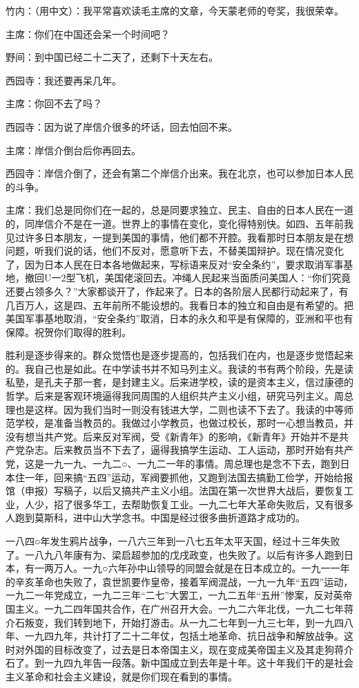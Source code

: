 竹内：（用中文）：我平常喜欢读毛主席的文章，今天蒙老师的夸奖，我很荣幸。

主席：你们在中国还会呆一个时间吧？

野间：到中国已经二十二天了，还剩下十天左右。

西园寺：我还要再呆几年。

主席：你回不去了吗？

西园寺：因为说了岸信介很多的坏话，回去怕回不来。

主席：岸信介倒台后你再回去。

西园寺：岸信介倒了，还会有第二个岸信介出来。我在北京，也可以参加日本人民的斗争。

主席：我们总是同你们在一起的，总是同要求独立、民主、自由的日本人民在一道的，同岸信介不是在一道。世界上的事情在变化，变化得特别快。如四、五年前我见过许多日本朋友，一提到美国的事情，他们都不开腔。我看那时日本朋友是在想问题，听我们说的话，他们不反对，愿意听下去，不替美国辩护。现在情况变化了，因为日本人民在日本各地做起来，写标语来反对“安全条约”，要求取消军事基地，撤回U一2型飞机，美国佬滚回去。冲绳人民起来当面质问美国人：“你们究竟还要占领多久？”大家都谈开了，作起来了。日本的各阶层人民都行动起来了，有几百万人，这是四、五年前所不能设想的。我看日本的独立和自由是有希望的。把美国军事基地取消，“安全条约”取消，日本的永久和平是有保障的，亚洲和平也有保障。祝贺你们取得的胜利。

胜利是逐步得来的。群众觉悟也是逐步提高的，包括我们在内，也是逐步觉悟起来的。我自己也是如此。在中学读书并不知马列主义。我读的书有两个阶段，先是读私塾，是孔夫子那一套，是封建主义。后来进学校，读的是资本主义，信过康德的哲学。后来是客观环境逼得我同周围的人组织共产主义小组，研究马列主义。周总理也是这样。因为我们当时一则没有钱进大学，二则也读不下去了。我读的中等师范学校，是准备当教员的。我做过小学教员，也做过校长，那时一心想当教员，并没有想当共产党。后来反对军阀，受《新青年》的影响，《新青年》开始并不是共产党杂志。后来教员当不下去了，逼得我搞学生运动、工人运动，那时开始有共产党，这是一九一九、一九二○、一九二一年的事情。周总理也是念不下去，跑到日本住一年，回来搞“五四”运动，军阀要抓他，又跑到法国去搞勤工俭学，开始给报馆（申报）写稿子，以后又搞共产主义小组。法国在第一次世界大战后，要恢复工业，人少，招了很多华工，去帮助恢复工业。一九二七年大革命失败后，又有很多人跑到莫斯科，进中山大学念书。中国是经过很多曲折道路才成功的。

一八四○年发生鸦片战争，一八六三年到一八七五年太平天国，经过十三年失败了。一八九八年康有为、梁启超参加的戊戌政变，也失败了。以后有许多人跑到日本，有一两万人。一九○六年孙中山领导的同盟会就是在日本成立的。一九一一年的辛亥革命也失败了，袁世凯要作皇帝，接着军阀混战，一九一九年“五四”运动，一九二一年党成立，一九二三年“二七”大罢工，一九二五年“五卅”惨案，反对英帝国主义。一九二四年国共合作，在广州召开大会。一九二六年北伐，一九二七年蒋介石叛变，我们转到地下，开始打游击。从一九二七年到一九三七年，到一九四八年、一九四九年，共计打了二十二年仗，包括土地革命、抗日战争和解放战争。这时对外国的目标改变了，过去是日本帝国主义，现在变成美帝国主义及其走狗蒋介石了。到一九四九年告一段落。新中国成立到去年是十年。这十年我们干的是社会主义革命和社会主义建设，就是你们现在看到的事情。

